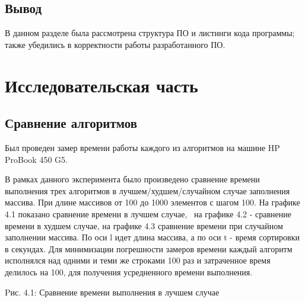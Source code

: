 \section*{Вывод}
В данном разделе была рассмотрена структура ПО и листинги кода программы; также убедились в корректности работы разработанного ПО.







\chapter{Исследовательская часть}

\section{Сравнение алгоритмов}

Был проведен замер времени работы каждого из алгоритмов на машине HP ProBook 450 G5. \cite{computer} 

В рамках данного эксперимента было произведено сравнение времени выполнения трех алгоритмов в лучшем/худшем/случайном случае заполнения массива. При длине массивов от 100 до 1000 элементов с шагом 100. На графике 4.1 показано сравнение времени в лучшем случае,  на графике 4.2 - сравнение времени в худшем случае, на графике 4.3 сравнение времени при случайном заполнении массива. По оси l идет длина массива, а по оси t - время сортировки в секундах.  Для минимизации погрешности замеров времени каждый алгоритм исполнялся над одними и теми же строками 100 раз и затраченное время делилось на 100, для получения усредненного времени выполнения.



\begin{center}
	Pис. 4.1: Сравнение времени выполнения в лучшем случае
\end{center}



